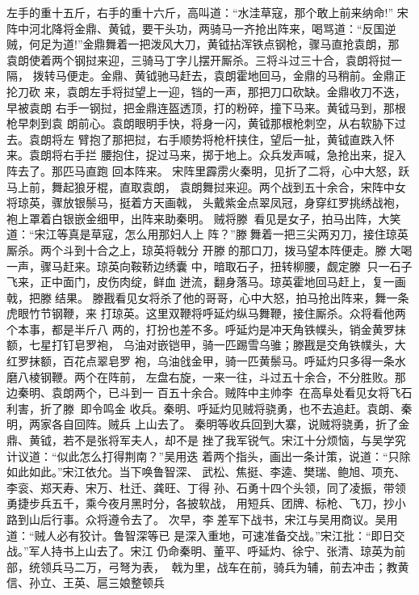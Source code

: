 左手的重十五斤，右手的重十六斤，高叫道：“水洼草寇，那个敢上前来纳命!”
宋阵中河北降将金鼎、黄钺，要干头功，两骑马一齐抢出阵来，喝骂道：“反国逆
贼，何足为道!”金鼎舞着一把泼风大刀，黄钺拈浑铁点钢枪，骤马直抢袁朗，那
袁朗使着两个钢挝来迎，三骑马丁字儿摆开厮杀。三将斗过三十合，袁朗将挝一隔，
拨转马便走。金鼎、黄钺驰马赶去，袁朗霍地回马，金鼎的马稍前。金鼎正抡刀砍
来，袁朗左手将挝望上一迎，铛的一声，那把刀口砍缺。金鼎收刀不迭，早被袁朗
右手一钢挝，把金鼎连盔透顶，打的粉碎，撞下马来。黄钺马到，那根枪早刺到袁
朗前心。袁朗眼明手快，将身一闪，黄钺那根枪刺空，从右软胁下过去。袁朗将左
臂抱了那把挝，右手顺势将枪杆挟住，望后一扯，黄钺直跌入怀来。袁朗将右手拦
腰抱住，捉过马来，掷于地上。众兵发声喊，急抢出来，捉入阵去了。那匹马直跑
回本阵来。
宋阵里霹雳火秦明，见折了二将，心中大怒，跃马上前，舞起狼牙棍，直取袁朗，
袁朗舞挝来迎。两个战到五十余合，宋阵中女将琼英，骤放银鬃马，挺着方天画戟，
头戴紫金点翠凤冠，身穿红罗挑绣战袍，袍上罩着白银嵌金细甲，出阵来助秦明。
贼将滕，看见是女子，拍马出阵，大笑道：“宋江等真是草寇，怎么用那妇人上
阵？”滕舞着一把三尖两刃刀，接住琼英厮杀。两个斗到十合之上，琼英将戟分
开滕的那口刀，拨马望本阵便走。滕大喝一声，骤马赶来。琼英向鞍鞒边绣囊
中，暗取石子，扭转柳腰，觑定滕，只一石子飞来，正中面门，皮伤肉绽，鲜血
迸流，翻身落马。琼英霍地回马赶上，复一画戟，把滕结果。
滕戡看见女将杀了他的哥哥，心中大怒，拍马抢出阵来，舞一条虎眼竹节钢鞭，来
打琼英。这里双鞭将呼延灼纵马舞鞭，接住厮杀。众将看他两个本事，都是半斤八
两的，打扮也差不多。呼延灼是冲天角铁幞头，销金黄罗抹额，七星打钉皂罗袍，
乌油对嵌铠甲，骑一匹踢雪乌骓；滕戡是交角铁幞头，大红罗抹额，百花点翠皂罗
袍，乌油戗金甲，骑一匹黄鬃马。呼延灼只多得一条水磨八棱钢鞭。两个在阵前，
左盘右旋，一来一往，斗过五十余合，不分胜败。那边秦明、袁朗两个，已斗到一
百五十余合。贼阵中主帅李，在高阜处看见女将飞石利害，折了滕，即令鸣金
收兵。秦明、呼延灼见贼将骁勇，也不去追赶。袁朗、秦明，两家各自回阵。贼兵
上山去了。
秦明等收兵回到大寨，说贼将骁勇，折了金鼎、黄钺，若不是张将军夫人，却不是
挫了我军锐气。宋江十分烦恼，与吴学究计议道：“似此怎么打得荆南？”吴用迭
着两个指头，画出一条计策，说道：“只除如此如此。”宋江依允。当下唤鲁智深、
武松、焦挺、李逵、樊瑞、鲍旭、项充、李衮、郑天寿、宋万、杜迁、龚旺、丁得
孙、石勇十四个头领，同了凌振，带领勇捷步兵五千，乘今夜月黑时分，各披软战，
用短兵、团牌、标枪、飞刀，抄小路到山后行事。众将遵令去了。
次早，李差军下战书，宋江与吴用商议。吴用道：“贼人必有狡计。鲁智深等已
是深入重地，可速准备交战。”宋江批：“即日交战。”军人持书上山去了。宋江
仍命秦明、董平、呼延灼、徐宁、张清、琼英为前部，统领兵马二万，弓弩为表，
戟为里，战车在前，骑兵为辅，前去冲击；教黄信、孙立、王英、扈三娘整顿兵
